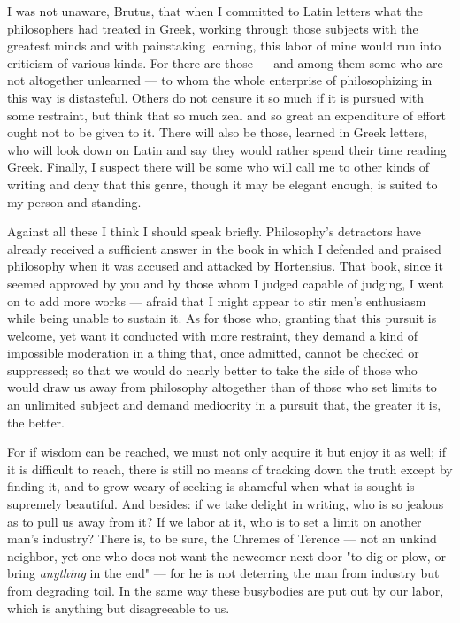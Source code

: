 

 I was not unaware, Brutus, that when I committed to Latin letters what the philosophers had treated in Greek, working through those subjects with the greatest minds and with painstaking learning, this labor of mine would run into criticism of various kinds. For there are those — and among them some who are not altogether unlearned — to whom the whole enterprise of philosophizing in this way is distasteful. Others do not censure it so much if it is pursued with some restraint, but think that so much zeal and so great an expenditure of effort ought not to be given to it. There will also be those, learned in Greek letters, who will look down on Latin and say they would rather spend their time reading Greek. Finally, I suspect there will be some who will call me to other kinds of writing and deny that this genre, though it may be elegant enough, is suited to my person and standing.

 Against all these I think I should speak briefly. Philosophy's detractors have already received a sufficient answer in the book in which I defended and praised philosophy when it was accused and attacked by Hortensius. That book, since it seemed approved by you and by those whom I judged capable of judging, I went on to add more works — afraid that I might appear to stir men's enthusiasm while being unable to sustain it. As for those who, granting that this pursuit is welcome, yet want it conducted with more restraint, they demand a kind of impossible moderation in a thing that, once admitted, cannot be checked or suppressed; so that we would do nearly better to take the side of those who would draw us away from philosophy altogether than of those who set limits to an unlimited subject and demand mediocrity in a pursuit that, the greater it is, the better.

 For if wisdom can be reached, we must not only acquire it but enjoy it as well; if it is difficult to reach, there is still no means of tracking down the truth except by finding it, and to grow weary of seeking is shameful when what is sought is supremely beautiful. And besides: if we take delight in writing, who is so jealous as to pull us away from it? If we labor at it, who is to set a limit on another man's industry? There is, to be sure, the Chremes of Terence — not an unkind neighbor, yet one who does not want the newcomer next door "to dig or plow, or bring \textit{anything} in the end" — for he is not deterring the man from industry but from degrading toil. In the same way these busybodies are put out by our labor, which is anything but disagreeable to us.

